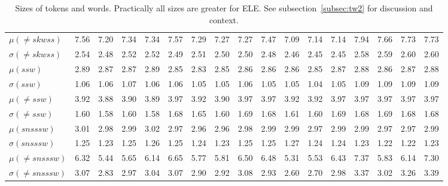 \documentclass[%
 aip,
 jmp,%
 amsmath,amssymb,
 reprint,%
 floatfix,
]{revtex4-1}
\begin{document}
\begin{table}
\begin{tabular}{|l|| c|c|c|c||  c|c|c|c||   c|c|c|c||   c|c|c|c|}
$\mu(\neq skwss)$ & 7.56 & 7.20 & 7.34 & 7.34 & 7.57 & 7.29 & 7.27 & 7.27 & 7.47 & 7.09 & 7.14 & 7.14 & 7.94 & 7.66 & 7.73 & 7.73 \\
$\sigma(\neq skwss)$ & 2.54 & 2.48 & 2.52 & 2.52 & 2.49 & 2.51 & 2.50 & 2.50 & 2.48 & 2.46 & 2.45 & 2.45 & 2.58 & 2.59 & 2.60 & 2.60 \\ \hline
$\mu(ssw)$ & 2.89 & 2.87 & 2.87 & 2.89 & 2.85 & 2.83 & 2.85 & 2.86 & 2.86 & 2.86 & 2.85 & 2.87 & 2.88 & 2.86 & 2.87 & 2.88 \\
$\sigma(ssw)$ & 1.06 & 1.06 & 1.07 & 1.06 & 1.06 & 1.05 & 1.05 & 1.06 & 1.05 & 1.05 & 1.04 & 1.05 & 1.09 & 1.09 & 1.09 & 1.09 \\
$\mu(\neq ssw)$ & 3.92 & 3.88 & 3.90 & 3.89 & 3.97 & 3.92 & 3.90 & 3.97 & 3.97 & 3.92 & 3.92 & 3.97 & 3.97 & 3.97 & 3.97 & 3.97 \\
$\sigma(\neq ssw)$ & 1.60 & 1.58 & 1.60 & 1.58 & 1.68 & 1.65 & 1.60 & 1.69 & 1.68 & 1.61 & 1.60 & 1.69 & 1.68 & 1.69 & 1.68 & 1.68 \\ \hline
$\mu(snsssw)$ & 3.01 & 2.98 & 2.99 & 3.02 & 2.97 & 2.96 & 2.96 & 2.98 & 2.99 & 2.99 & 2.97 & 2.99 & 2.99 & 2.97 & 2.97 & 2.99 \\
$\sigma(snsssw)$ & 1.25 & 1.23 & 1.25 & 1.26 & 1.25 & 1.24 & 1.23 & 1.25 & 1.25 & 1.27 & 1.24 & 1.24 & 1.23 & 1.22 & 1.22 & 1.23 \\
$\mu(\neq snsssw)$ & 6.32 & 5.44 & 5.65 & 6.14 & 6.65 & 5.77 & 5.81 & 6.50 & 6.48 & 5.31 & 5.53 & 6.43 & 7.37 & 5.83 & 6.14 & 7.30 \\
$\sigma(\neq snsssw)$ & 3.07 & 2.83 & 2.97 & 3.04 & 3.07 & 2.90 & 2.92 & 3.08 & 2.93 & 2.60 & 2.70 & 2.98 & 3.37 & 3.02 & 3.26 & 3.39 \\ \hline
  \end{tabular}
  \caption{Sizes of tokens and words. Practically all sizes are greater for ELE. See subsection~\ref{subsec:tw2} for discussion and context.}
  \label{tab:sizesTokens}
\end{table}
\end{document}
